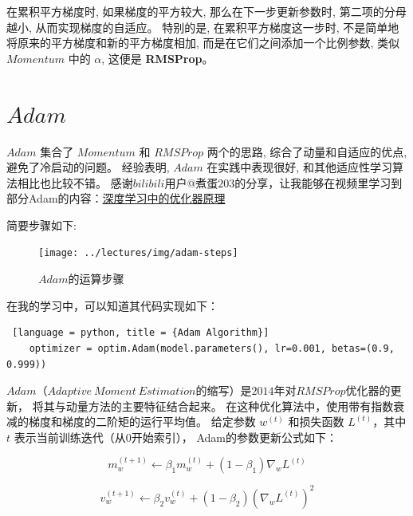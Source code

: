 \documentclass[printMode=false, declarePage=false]{ecnuthesis}
\begin{document}
    在累积平方梯度时, 如果梯度的平方较大, 那么在下一步更新参数时, 第二项的分母越小, 从而实现梯度的自适应。\cite{duchi2011adaptive}
    特别的是, 在累积平方梯度这一步时, 不是简单地将原来的平方梯度和新的平方梯度相加, 而是在它们之间添加一个比例参数, 
    类似 $Momentum$ 中的 \( \alpha \)\cite{qian1999momentum, sutskever2013importance}, 这便是 \textbf{RMSProp}。


    \section{$Adam$}

    $Adam$ 集合了 $Momentum$ 和 $RMSProp$ 两个的思路, 综合了动量和自适应的优点, 避免了冷启动的问题。\cite{kingma2015adam}
    经验表明, $Adam$ 在实践中表现很好, 和其他适应性学习算法相比也比较不错。
    感谢$bilibili$用户@煮蛋$203$的分享，让我能够在视频里学习到部分Adam的内容：\href{www.bilibili.com/video/BV1YF411n7Dr}{深度学习中的优化器原理}
    
    简要步骤如下:\cite{bilibili2024gradientdescent}

    \begin{figure} [H]
        \centering
        \texttt{[image: ../lectures/img/adam-steps]}
        \caption{$Adam$的运算步骤}
    \end{figure}

    在我的学习中，可以知道其代码实现如下：

    \begin{lstlisting} [language = python, title = {Adam Algorithm}]
    optimizer = optim.Adam(model.parameters(), lr=0.001, betas=(0.9, 0.999))
    \end{lstlisting}

    $Adam$（$Adaptive\ Moment\ Estimation$的缩写）是$2014$年对$RMSProp$优化器的更新，
    将其与动量方法的主要特征结合起来。
    在这种优化算法中，使用带有指数衰减的梯度和梯度的二阶矩的运行平均值。
    给定参数 \( w^{(t)} \) 和损失函数 \( L^{(t)} \)，其中 \( t \) 表示当前训练迭代（从$0$开始索引），
    Adam的参数更新公式如下：

    \begin{equation}
        m_w^{(t+1)} \leftarrow \beta_1 m_w^{(t)} + (1 - \beta_1) \nabla_w L^{(t)}
    \end{equation}
        
    \begin{equation}
        v_w^{(t+1)} \leftarrow \beta_2 v_w^{(t)} + (1 - \beta_2) (\nabla_w L^{(t)})^2
    \end{equation}
        
\end{document}
